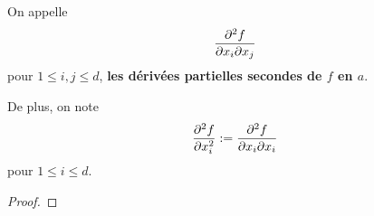 On appelle 
\begin{equation*}
	\pdv{f}{x_{i}}{x_{j}} (a)
\end{equation*}
pour $1 \leq i, j \leq d$, \textbf{les dérivées partielles secondes de $f$ en $a$}.

De plus, on note
\begin{equation*}
	\pdv[2]{f}{x_{i}} (a) := \pdv{f}{x_{i}}{x_{i}} (a)
\end{equation*}
pour $1 \leq i \leq d$.

\ifdefined\outputproof
\begin{proof}



\end{proof}
\fi

